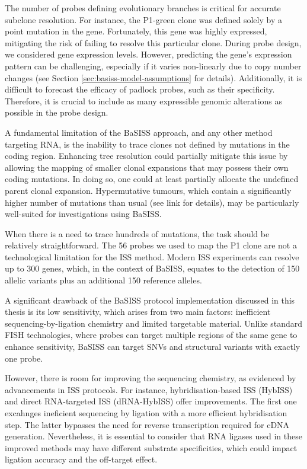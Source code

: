 The number of probes defining evolutionary branches is critical for accurate subclone resolution. For instance, the P1-green clone was defined solely by a point mutation in the  gene. Fortunately, this gene was highly expressed, mitigating the risk of failing to resolve this particular clone. During probe design, we considered gene expression levels. However, predicting the gene's expression pattern can be challenging, especially if it varies non-linearly due to copy number changes (see Section \ref{sec:basiss-model-assumptions} for details). Additionally, it is difficult to forecast the efficacy of padlock probes, such as their specificity. Therefore, it is crucial to include as many expressible genomic alterations as possible in the probe design.

A fundamental limitation of the BaSISS approach, and any other method targeting RNA, is the inability to trace clones not defined by mutations in the coding region. Enhancing tree resolution could partially mitigate this issue by allowing the mapping of smaller clonal expansions that may possess their own coding mutations. In doing so, one could at least partially allocate the undefined parent clonal expansion. Hypermutative tumours, which contain a significantly higher number of mutations than usual (see link for details), may be particularly well-suited for investigations using BaSISS.

When there is a need to trace hundreds of mutations, the task should be relatively straightforward. The 56 probes we used to map the P1 clone are not a technological limitation for the \ac{ISS} method. Modern \ac{ISS} experiments can resolve up to 300 genes, which, in the context of \ac{BaSISS}, equates to the detection of 150 allelic variants plus an additional 150 reference alleles.

A significant drawback of the BaSISS protocol implementation discussed in this thesis is its low sensitivity, which arises from two main factors: inefficient sequencing-by-ligation chemistry and limited targetable material. Unlike standard FISH technologies, where probes can target multiple regions of the same gene to enhance sensitivity, \ac{BaSISS} can target \acp{SNV} and structural variants with exactly one probe.

However, there is room for improving the sequencing chemistry, as evidenced by advancements in \ac{ISS} protocols. For instance, hybridisation-based \ac{ISS} (HybISS) \parencite{Gyllborg2020-uq} and direct RNA-targeted \ac{ISS} (dRNA-HybISS) \parencite{Lee2022-ha} offer improvements. The first one excahnges ineficient sequencing by ligation with a more efficient hybridisation step. The latter bypasses the need for reverse transcription required for cDNA generation. Nevertheless, it is essential to consider that RNA ligases used in these improved methods may have different substrate specificities, which could impact ligation accuracy and the off-target effect.

